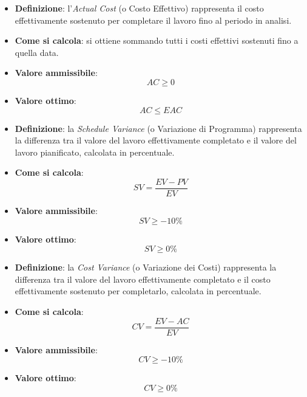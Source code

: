 \hypertarget{3M}{}
\begin{itemize}
	\item \textbf{Definizione}: l'\textit{Actual Cost} (o Costo Effettivo) rappresenta il costo effettivamente sostenuto per completare il lavoro fino al periodo in analisi.
	\item \textbf{Come si calcola}: si ottiene sommando tutti i costi effettivi sostenuti fino a quella data.
	\item \textbf{Valore ammissibile}: \begin{equation*}AC \geq 0\end{equation*}
	\item \textbf{Valore ottimo}: \begin{equation*}AC \leq EAC\end{equation*}
\end{itemize}

\hypertarget{4M}{}
\begin{itemize}
	\item \textbf{Definizione}: la \textit{Schedule Variance} (o Variazione di Programma) rappresenta la differenza tra il valore del lavoro effettivamente completato e il valore del lavoro pianificato, calcolata in percentuale.
	\item \textbf{Come si calcola}: \begin{equation*}SV = \frac{EV - PV}{EV}\end{equation*}
	\item \textbf{Valore ammissibile}: \begin{equation*}SV \geq -10\%\end{equation*}
	\item \textbf{Valore ottimo}: \begin{equation*}SV \geq 0\%\end{equation*}
\end{itemize}

\hypertarget{5M}{}
\begin{itemize}
	\item \textbf{Definizione}: la \textit{Cost Variance} (o Variazione dei Costi) rappresenta la differenza tra il valore del lavoro effettivamente completato e il costo effettivamente sostenuto per completarlo, calcolata in percentuale.
	\item \textbf{Come si calcola}: \begin{equation*}CV = \frac{EV - AC}{EV}\end{equation*}
	\item \textbf{Valore ammissibile}: \begin{equation*}CV \geq -10\%\end{equation*}
	\item \textbf{Valore ottimo}: \begin{equation*}CV \geq 0\%\end{equation*}
\end{itemize}

